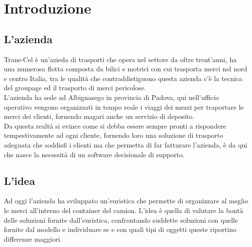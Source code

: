 
\chapter{Introduzione}
\label{introduzione}
\section{L'azienda}
Trans-Cel è un'azieda di trasporti che opera nel settore da oltre trent'anni, ha una numerosa flotta composta da bilici e motrici con cui trasporta merci nel nord e centro Italia, tra le qualità che contraddistiguono questa azienda c'è la tecnica del groupage ed il trasporto di merci pericolose.\\
L'azienda ha sede ad Albignasego in provincia di Padova, qui nell'ufficio operativo vengono organizzati in tempo reale i viaggi dei mezzi per traportare le merci dei clienti, fornendo magari anche un servizio di deposito.\\
Da questa realtà si evince come si debba essere sempre pronti a rispondere tempestivamente ad ogni cliente, fornendo loro una soluzione di trasporto adeguata che soddisfi i clienti ma che permetta di far fatturare l'azienda, è da qui che nasce la necessità di un software decisionale di supporto.

\section{L'idea}
Ad oggi l'azienda ha sviluppato un'euristica che permette di organizzare al meglio le merci all'interno del container del camion.
L'idea è quella di valutare la bontà delle soluzioni fornite dall'euristica, confrontando suddette soluzioni con quelle fornite dal modello e individuare se e con quali tipi di oggetti queste riportino differenze maggiori.
\newpage
